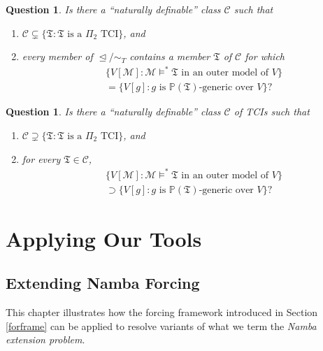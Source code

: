 \documentclass[12pt, twoside]{memoir}
\numberwithin{equation}{section}
\newtheorem{ques}[thm]{Question}
\theoremstyle{definition}
\theoremstyle{remark}
\theoremstyle{definition}
\theoremstyle{definition}
\theoremstyle{definition}
\theoremstyle{remark}
\begin{document}
\begin{ques}
Is there a ``naturally definable'' class $\mathcal{C}$ such that 
\begin{enumerate}[label=(\alph*)]
    \item $\mathcal{C} \subsetneq \{\mathfrak{T} : \mathfrak{T} \text{ is a } \Pi_2 \text{ TCI}\}$, and
    \item every member of $\trianglelefteq / \sim_T$ contains a member $\mathfrak{T}$ of $\mathcal{C}$ for which
    \begin{align*}
        & \{V[\mathcal{M}] : \mathcal{M} \models^* \mathfrak{T} \text{ in an outer model of } V\} \\
        & = \{V[g] : g \text{ is } \mathbb{P}(\mathfrak{T}) \text{-generic over } V\} \text{?}
    \end{align*}
\end{enumerate} 
\end{ques}

\begin{ques}
Is there a ``naturally definable'' class $\mathcal{C}$ of TCIs such that 
\begin{enumerate}[label=(\alph*)]
    \item $\mathcal{C} \supsetneq \{\mathfrak{T} : \mathfrak{T} \text{ is a } \Pi_2 \text{ TCI}\}$, and
    \item for every $\mathfrak{T} \in \mathcal{C}$, 
    \begin{align*}
        & \{V[\mathcal{M}] : \mathcal{M} \models^* \mathfrak{T} \text{ in an outer model of } V\} \\
        & \supset \{V[g] : g \text{ is } \mathbb{P}(\mathfrak{T}) \text{-generic over } V\} \text{?}
    \end{align*}
\end{enumerate} 
\end{ques}

\part{\texorpdfstring{  Applying Our Tools}{Applying Our Tools}}

\chapter{Extending Namba Forcing}\label{sect2}

This chapter illustrates how the forcing framework introduced in Section \ref{forframe} can be applied to resolve variants of what we term the \textit{Namba extension problem}.
\end{document}

